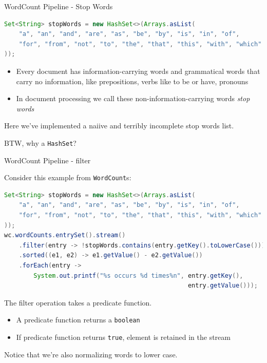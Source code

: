 \documentclass{beamer}
\begin{document}
\begin{frame}[fragile]{WordCount Pipeline - Stop Words}

\begin{lstlisting}[language=Java]
Set<String> stopWords = new HashSet<>(Arrays.asList(
    "a", "an", "and", "are", "as", "be", "by", "is", "in", "of",
    "for", "from", "not", "to", "the", "that", "this", "with", "which"
));

\end{lstlisting}


\begin{itemize}
\item Every document has information-carrying words and grammatical words that carry no information, like prepositions, verbs like to be or have, pronouns
\item In document processing we call these non-information-carrying words {\it stop words}
\end{itemize}

Here we've implemented a naiive and terribly incomplete stop words list.\\

\vspace{.1in}

BTW, why a {\tt HashSet}?

\end{frame}

\begin{frame}[fragile]{WordCount Pipeline - filter}

Consider this example from {\tt WordCount}s:
\begin{lstlisting}[language=Java]
Set<String> stopWords = new HashSet<>(Arrays.asList(
    "a", "an", "and", "are", "as", "be", "by", "is", "in", "of",
    "for", "from", "not", "to", "the", "that", "this", "with", "which"
));
wc.wordCounts.entrySet().stream()
    .filter(entry -> !stopWords.contains(entry.getKey().toLowerCase()))
    .sorted((e1, e2) -> e1.getValue() - e2.getValue())
    .forEach(entry ->
        System.out.printf("%s occurs %d times%n", entry.getKey(),
                                                  entry.getValue()));
\end{lstlisting}

The filter operation takes a predicate function.
\begin{itemize}
\item A predicate function returns a {\tt boolean}
\item If predicate function returns {\tt true}, element is retained in the stream
\end{itemize}
Notice that we're also normalizing words to lower case.

\end{frame}
\end{document}
